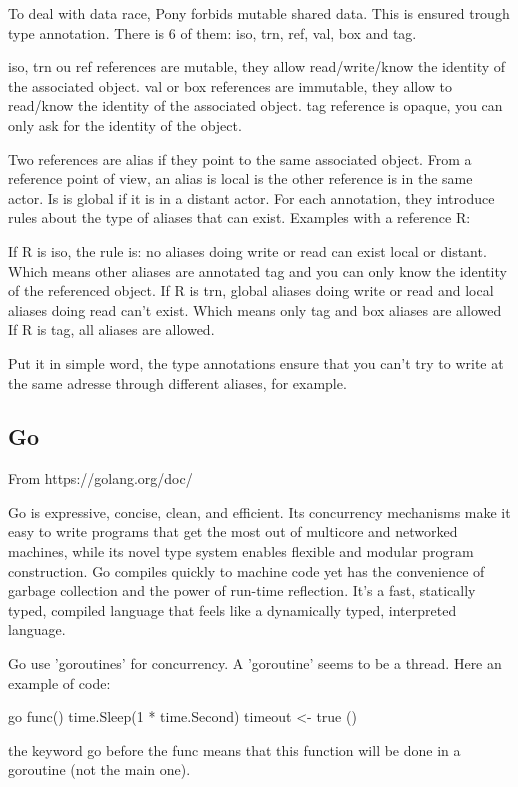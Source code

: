 \documentclass[11pt]{article} %
\begin{document}
To deal with data race, Pony forbids mutable shared data. This is ensured trough type annotation.
There is 6 of them: iso, trn, ref, val, box and tag.

     iso, trn ou ref references are mutable, they allow read/write/know the identity of the associated object.
    val or box references are immutable, they allow to read/know the identity of the associated object.
    tag reference is opaque, you can only ask for the identity of the object.

Two references are alias if they point to the same associated object. From a reference point of view, an alias is local is the other reference is in the same actor. Is is global if it is in a distant actor.
For each annotation, they introduce rules about the type of aliases that can exist.
Examples with a reference R:

    If R is iso, the rule is: no aliases doing write or read can exist local or distant. Which means other aliases are annotated tag and you can only know the identity of the referenced object.
    If R is trn, global aliases doing write or read and local aliases doing read can't exist. Which means only tag and box aliases are allowed
    If R is tag, all aliases are allowed.

Put it in simple word, the type annotations ensure that you can't try to write at the same adresse through different aliases, for example.

\subsection{Go}
From https://golang.org/doc/

Go is expressive, concise, clean, and efficient. Its concurrency mechanisms make it easy to write programs that get the most out of multicore and networked machines, while its novel type system enables flexible and modular program construction. Go compiles quickly to machine code yet has the convenience of garbage collection and the power of run-time reflection. It's a fast, statically typed, compiled language that feels like a dynamically typed, interpreted language.

Go use 'goroutines' for concurrency. A 'goroutine' seems to be a thread. Here an example of code:

go func() {
    time.Sleep(1 * time.Second)
    timeout <- true
}()

the keyword go before the func means that this function will be done in a goroutine (not the main one).
\end{document}

